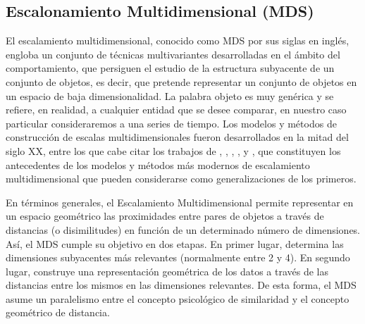 \documentclass[12pt,oneside]{book}\usepackage[]{graphicx}\usepackage[]{color}
\theoremstyle{definition} %
\begin{document}

\subsection{Escalonamiento Multidimensional (MDS)}


El escalamiento multidimensional, conocido como MDS por sus siglas en inglés, engloba un conjunto de técnicas multivariantes desarrolladas en el ámbito del comportamiento, que persiguen el estudio de la estructura subyacente de un conjunto de objetos, es decir, que pretende representar un conjunto de objetos en un espacio de baja dimensionalidad. La palabra objeto es muy genérica y se refiere, en realidad, a cualquier entidad que se desee comparar, en nuestro caso particular consideraremos a una series de tiempo. Los modelos y métodos de construcción de escalas multidimensionales fueron desarrollados en la mitad del siglo XX, entre los que cabe citar los trabajos de \citeauthor{stevens1946theory} \citeyear{stevens1946theory}, \citeauthor{coombs1950psychological} \citeyear{coombs1950psychological}, \citeauthor{torgerson1958theory} \citeyear{torgerson1958theory}, \citeauthor{kruskal1964multidimensional} \citeyear{kruskal1964multidimensional}, y \citeauthor{guttman1968general} \citeyear{guttman1968general}, que constituyen los antecedentes de los modelos y métodos más modernos de escalamiento multidimensional que pueden considerarse como generalizaciones de los primeros.




En términos generales, el Escalamiento Multidimensional permite representar en un espacio geométrico las proximidades entre pares de objetos a través de distancias (o disimilitudes) en función de un determinado número de dimensiones. Así, el MDS cumple su objetivo en dos etapas. En primer lugar, determina las dimensiones subyacentes más relevantes (normalmente entre 2 y 4). En segundo lugar, construye una representación geométrica de los datos a través de las distancias entre los mismos en las dimensiones relevantes.  De esta forma, el MDS asume un paralelismo entre el concepto psicológico de similaridad y el concepto geométrico de distancia.


\end{document}
